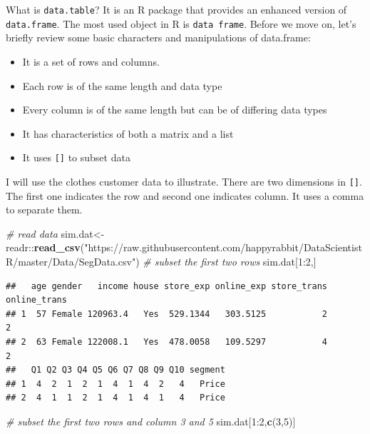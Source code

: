\documentclass[]{book}
\newenvironment{Shaded}{\begin{snugshade}}{\end{snugshade}}
\newcommand{\KeywordTok}[1]{\textcolor[rgb]{0.13,0.29,0.53}{\textbf{{#1}}}}
\newcommand{\DecValTok}[1]{\textcolor[rgb]{0.00,0.00,0.81}{{#1}}}
\newcommand{\StringTok}[1]{\textcolor[rgb]{0.31,0.60,0.02}{{#1}}}
\newcommand{\CommentTok}[1]{\textcolor[rgb]{0.56,0.35,0.01}{\textit{{#1}}}}
\newcommand{\NormalTok}[1]{{#1}}
\providecommand{\tightlist}{%
  \setlength{\itemsep}{0pt}\setlength{\parskip}{0pt}}
\theoremstyle{definition}
\theoremstyle{definition}
\theoremstyle{remark}
\begin{document}
What is \texttt{data.table}? It is an R package that provides an
enhanced version of \texttt{data.frame}. The most used object in R is
\texttt{data\ frame}. Before we move on, let's briefly review some basic
characters and manipulations of data.frame:

\begin{itemize}
\tightlist
\item
  It is a set of rows and columns.
\item
  Each row is of the same length and data type
\item
  Every column is of the same length but can be of differing data types
\item
  It has characteristics of both a matrix and a list
\item
  It uses \texttt{{[}{]}} to subset data
\end{itemize}

I will use the clothes customer data to illustrate. There are two
dimensions in \texttt{{[}{]}}. The first one indicates the row and
second one indicates column. It uses a comma to separate them.

\begin{Shaded}
\begin{Highlighting}[]
\CommentTok{# read data}
\NormalTok{sim.dat<-readr::}\KeywordTok{read_csv}\NormalTok{(}\StringTok{"https://raw.githubusercontent.com/happyrabbit/DataScientistR/master/Data/SegData.csv"}\NormalTok{)}
\CommentTok{# subset the first two rows}
\NormalTok{sim.dat[}\DecValTok{1}\NormalTok{:}\DecValTok{2}\NormalTok{,]}
\end{Highlighting}
\end{Shaded}

\begin{verbatim}
##   age gender   income house store_exp online_exp store_trans online_trans
## 1  57 Female 120963.4   Yes  529.1344   303.5125           2            2
## 2  63 Female 122008.1   Yes  478.0058   109.5297           4            2
##   Q1 Q2 Q3 Q4 Q5 Q6 Q7 Q8 Q9 Q10 segment
## 1  4  2  1  2  1  4  1  4  2   4   Price
## 2  4  1  1  2  1  4  1  4  1   4   Price
\end{verbatim}

\begin{Shaded}
\begin{Highlighting}[]
\CommentTok{# subset the first two rows and column 3 and 5}
\NormalTok{sim.dat[}\DecValTok{1}\NormalTok{:}\DecValTok{2}\NormalTok{,}\KeywordTok{c}\NormalTok{(}\DecValTok{3}\NormalTok{,}\DecValTok{5}\NormalTok{)]}
\end{Highlighting}
\end{Shaded}
\end{document}
